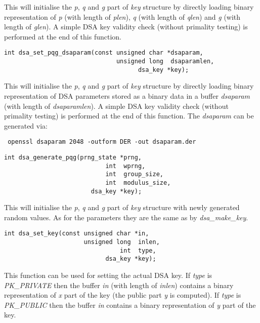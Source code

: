 \documentclass[synpaper]{book}
\begin{document}
This will initialise the \textit{p}, \textit{q} and \textit{g} part of \textit{key} structure by directly loading binary
representation of \textit{p} (with length of \textit{plen}), \textit{q} (with length of \textit{qlen}) and \textit{g} (with length of \textit{glen}).
A simple DSA key validity check (without primality testing) is performed at the end of this function.

\begin{verbatim}
int dsa_set_pqg_dsaparam(const unsigned char *dsaparam,
                               unsigned long  dsaparamlen,
                                     dsa_key *key);
\end{verbatim}

This will initialise the \textit{p}, \textit{q} and \textit{g} part of \textit{key} structure by directly loading binary representation
of DSA parameters stored as a binary data in a buffer \textit{dsaparam} (with length of \textit{dsaparamlen}). A simple DSA key validity
check (without primality testing) is performed at the end of this function. The \textit{dsaparam} can be generated via:
\begin{verbatim}
 openssl dsaparam 2048 -outform DER -out dsaparam.der
\end{verbatim}

\begin{verbatim}
int dsa_generate_pqg(prng_state *prng,
                            int  wprng,
                            int  group_size,
                            int  modulus_size,
                        dsa_key *key);
\end{verbatim}

This will initialise the \textit{p}, \textit{q} and \textit{g} part of \textit{key} structure with newly generated random values.
As for the parameters they are the same as by \textit{dsa\_make\_key}.

\begin{verbatim}
int dsa_set_key(const unsigned char *in,
                      unsigned long  inlen,
                                int  type,
                            dsa_key *key);
\end{verbatim}

This function can be used for setting the actual DSA key. If \textit{type} is \textit{PK\_PRIVATE} then the buffer \textit{in}
(with length of \textit{inlen}) contains a binary representation of \textit{x} part of the key (the public part \textit{y} is computed).
If \textit{type} is \textit{PK\_PUBLIC} then the buffer \textit{in} contains a binary representation of \textit{y} part of the key.
\end{document}
